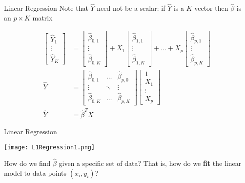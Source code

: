 \documentclass[10pt, handout]{beamer}
\begin{document}
\begin{frame}[fragile]{Linear Regression}
Note that $\hat Y$ need not be a scalar: if $\hat Y$ is a $K$ vector then $\hat \beta$ is an $p\times K$ matrix

\begin{align*}
\left[\begin{matrix}
\hat Y_1
\\
\vdots
\\
\hat Y_K
\end{matrix}\right]
&=
\left[\begin{matrix}
\hat \beta_{0,1}
\\
\vdots
\\
\hat \beta_{0,K}
\end{matrix}\right]
+
X_1\left[\begin{matrix}
\hat \beta_{1,1}
\\
\vdots
\\
\hat \beta_{1,K}
\end{matrix}\right]
+
\ldots
+
X_p
\left[\begin{matrix}
\hat \beta_{p,1}
\\
\vdots
\\
\hat \beta_{p,K}
\end{matrix}\right]
\\
\hat Y&= 
\left[\begin{matrix}
\hat \beta_{0,1}&\ldots &\hat \beta_{p,0}
\\
\vdots&\ddots&\vdots
\\
\hat \beta_{0,K} & \ldots & \hat \beta_{p,K}
\end{matrix}\right]
\left[\begin{matrix}
1\\
X_1\\
\vdots\\
X_p
\end{matrix}\right]
\\
\hat Y  &= \hat\beta^TX
\end{align*}

\end{frame}



\begin{frame}[fragile]{Linear Regression}
  \begin{minipage}[t][0.5\textheight][t]{\textwidth}
    \centering
     \texttt{[image: L1Regression1.png]}
  \end{minipage}
  \vfill
  \begin{minipage}[t][0.5\textheight][t]{\textwidth}
How do we find $\hat\beta$ given a specific set of data? That is, how do we \textbf{fit} the linear model to data points $(x_i,y_i)$?
  \end{minipage}
\end{frame}
\end{document}

